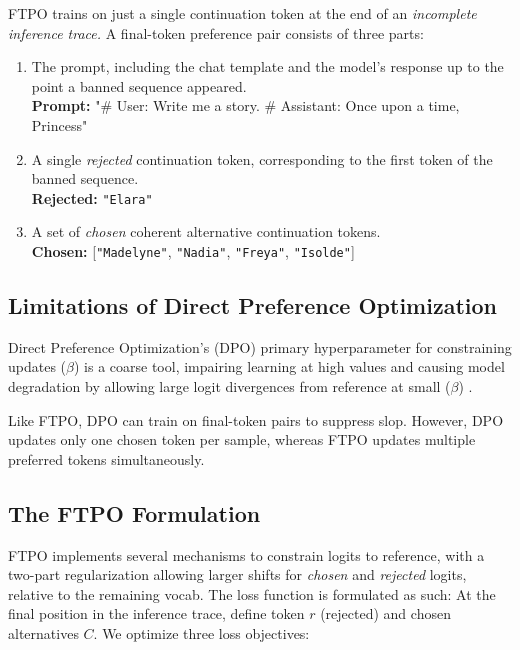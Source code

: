 \documentclass[11pt]{article}
\begin{document}
FTPO trains on just a single continuation token at the end of an \textit{incomplete inference trace.} A final-token preference pair consists of three parts:

{
\begin{enumerate}[label=(\arabic*), leftmargin=*, itemsep=2pt, topsep=2pt, parsep=0pt, partopsep=0pt]
  \item The prompt, including the chat template and the model's response up to the point a banned sequence appeared.\\
        \textbf{Prompt:} "\# User: Write me a story. \# Assistant: Once upon a time, Princess"
  \item A single \textit{rejected} continuation token, corresponding to the first token of the banned sequence.\\
        \textbf{Rejected:} \verb!"Elara"!
  \item A set of \textit{chosen} coherent alternative continuation tokens.\\
        \textbf{Chosen:} [\verb!"Madelyne"!, \verb!"Nadia"!, \verb!"Freya"!, \verb!"Isolde"!]
\end{enumerate}
}



\subsection{Limitations of Direct Preference Optimization}

Direct Preference Optimization's (DPO) \citep{rafailov-etal-2023-direct} primary hyperparameter for constraining updates ($\beta$) is a coarse tool, impairing learning at high values and causing model degradation by allowing large logit divergences from reference at small ($\beta$) \citep{wu2024betaDPO}.

Like FTPO, DPO can train on final-token pairs to suppress slop. However, DPO updates only one chosen token per sample, whereas FTPO updates multiple preferred tokens simultaneously.


\subsection{The FTPO Formulation}
\label{sec:ftpo}
FTPO implements several mechanisms to constrain logits to reference, with a two-part regularization allowing larger shifts for \textit{chosen} and \textit{rejected} logits, relative to the remaining vocab. The loss function is formulated as such: At the final position in the inference trace, define token $r$ (rejected) and chosen alternatives $C$. We optimize three loss objectives:
\end{document}
